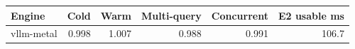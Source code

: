 \begin{tabular}{lrrrrr}
\toprule
Engine & Cold & Warm & Multi-query & Concurrent & E2 usable ms \\
\midrule
vllm-metal & 0.998 & 1.007 & 0.988 & 0.991 & 106.7 \\
\bottomrule
\end{tabular}
